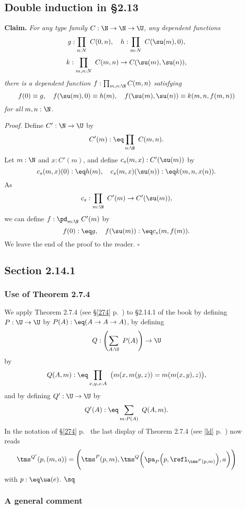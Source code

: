 \documentclass[12pt]{article}
\begin{document}

\subsection{Double induction in \S2.13}

\nn\textbf{Claim.} \emph{For any type family $C:\N\to\N\to\U$, any dependent functions}
$$
g:\prod_{n:N}\ C(0,n),\quad h:\prod_{m:N}\ C(\su(m),0),
$$
$$
k:\prod_{m,n:N}\ C(m,n)\to C(\su(m),\su(n)),
$$ 
\emph{there is a dependent function $f:\prod_{m,n:\N}C(m,n)$ satisfying}
$$
f(0)\equiv g,\quad f(\su(m),0)\equiv h(m),\quad f(\su(m),\su(n))\equiv k(m,n,f(m,n))
$$ 
\emph{for all} $m,n:\N$.

\nn\emph{Proof.} Define $C':\N\to\U$ by 
$$
C'(m):\eq\prod_{n:\N}\ C(m,n).
$$ 
Let $m:\N$ and $x:C'(m)$, and define $c_s(m,x):C'(\su(m))$ by 
$$
c_s(m,x)(0):\eq h(m),\quad c_s(m,x)(\su(n)):\eq k(m,n,x(n)).
$$ 
As  
$$
c_s:\prod_{m:\N}\ C'(m)\to C'(\su(m)),
$$ 
we can define $f:\pd_{m:\N}\ C'(m)$ by 
$$
f(0):\eq g,\quad f(\su(m)):\eq c_s(m,f(m)).
$$ 
We leave the end of the proof to the reader. $\square$


\subsection{Section 2.14.1}

\subsubsection{Use of Theorem 2.7.4}


We apply Theorem 2.7.4 (see \S\ref{274} p.~\pageref{274}) to \S2.14.1 of the book by defining $P:\U\to\U$ by $P(A):\eq(A\to A\to A)$, by defining 
$$
Q:\left(\sum_{A:\U}\ P(A)\right)\to\U
$$ 
by 
$$
Q(A,m):\eq\prod_{x,y,z:A}\ \big(m(x,m(y,z))=m(m(x,y),z)\big),
$$ 
and by defining $Q':\U\to\U$ by 
$$ 
Q'(A):\eq\sum_{m:P(A)}\ Q(A,m).
$$  
In the notation of \S\ref{274} p.~\pageref{274} the last display of Theorem 2.7.4 (see \eqref{ld} p.~\pageref{ld}) now reads 
$$
\tms^{Q'}(p,(m,a))=\Bigg(\tms^P(p,m),\tms^Q\bigg(\pa_P\Big(p,\refl_{\tms^P(p,m)}\Big),a\bigg)\Bigg)
$$ 
with $p:\eq\ua(e)$. $\sq$

\subsubsection{A general comment}
\end{document}

